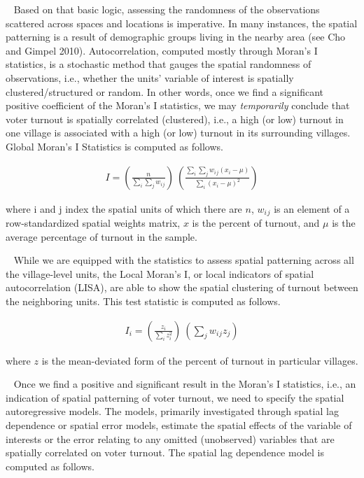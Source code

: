 \documentclass[
  12pt,
]{article}
\begin{document}
~ Based on that basic logic, assessing the randomness of the
observations scattered across spaces and locations is imperative. In
many instances, the spatial patterning is a result of demographic groups
living in the nearby area (see Cho and Gimpel 2010). Autocorrelation,
computed mostly through Moran's I statistics, is a stochastic method
that gauges the spatial randomness of observations, i.e., whether the
units' variable of interest is spatially clustered/structured or random.
In other words, once we find a significant positive coefficient of the
Moran's I statistics, we may \emph{temporarily} conclude that voter
turnout is spatially correlated (clustered), i.e., a high (or low)
turnout in one village is associated with a high (or low) turnout in its
surrounding villages. Global Moran's I Statistics is computed as
follows.

\begin{align}
I = \left(\frac{n}{\sum_i \sum_j w_i{_j}} \right) \ \left(\frac{\sum_i \sum_j w_i{_j}(x_i - \mu)}
{\sum_i (x_i - \mu)^2}\right)
\end{align}

where i and j index the spatial units of which there are \(n\),
\(w_i{_j}\) is an element of a row-standardized spatial weights matrix,
\(x\) is the percent of turnout, and \(\mu\) is the average percentage
of turnout in the sample.

~ While we are equipped with the statistics to assess spatial patterning
across all the village-level units, the Local Moran's I, or local
indicators of spatial autocorrelation (LISA), are able to show the
spatial clustering of turnout between the neighboring units. This test
statistic is computed as follows.

\begin{align}
I_i = \left(\frac{z_i}{\sum_i z_i^2} \right) \ \left({ \sum_j w_i{_j} z_j} \right)
\end{align}

where \(z\) is the mean-deviated form of the percent of turnout in
particular villages.

~ Once we find a positive and significant result in the Moran's I
statistics, i.e., an indication of spatial patterning of voter turnout,
we need to specify the spatial autoregressive models. The models,
primarily investigated through spatial lag dependence or spatial error
models, estimate the spatial effects of the variable of interests or the
error relating to any omitted (unobserved) variables that are spatially
correlated on voter turnout. The spatial lag dependence model is
computed as follows.
\end{document}
